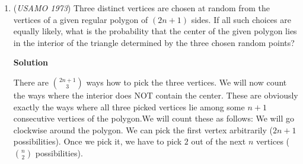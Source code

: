 \begin{enumerate}
 $X_n = \frac{1}{3}(2)^n + \frac{2}{3}(-1)^n$

 Doing the same for $Y_n$, we get

 $Y_n = 2(3)^n - (-1)^n$

 We know they're equal at $n = 0$, so let's set them equal and compare.

 $2(3)^n - (-1)^n = \frac{1}{3}((2)^n + 2(-1)^n)$
$6(3)^n - 3(-1)^n = (2)^n + 2(-1)^n$
$6(3)^n - 2^n = 5(-1)^n$

 By induction, we know in general that $(\alpha + 1)^n > \alpha^n$ for all $\alpha, n > 0$, so $6(3)^n > 2^n$ for all $n > 1$. 

 Therefore, the left hand side is always increasing and will never equal 5 again, so equality between $X_n$ and $Y_n$ only holds when $n = 0$, so they only share 1 term.

 


 



\textbf{Solution 3 (simple)}

First, $X_n$ and $Y_n$ are both positive for all nonnegative integers $n$. This is since $X_1$, $X_2$, $Y_1$, and $Y_2$ are all positive, and if $X_n$ and $X_{n-1}$ is positive then $X_{n+1}$ as a sum of two positive numbers is positive, and similarly for $Y_n$. Simple.

 Next, consider $Z_n = Y_n - X_n$. We have $Z_{n+1} = Y_n + Z_n + 3 Z_{n-1} + X_{n-1}$. Another easy inductive argument like above shows that $Z_n >0$ if $n>0$. But if $Z_n >0$ then $Z_n \ne 0$, so $X_n \ne Y_n$ as desired.

 
<i>Alternate solutions are always welcome. If you have a different, elegant solution to this problem, please \href{https://artofproblemsolving.com/wiki/index.php?title=1973\_USAMO\_Problems/Problem\_2&action=edit}{add it} to this page.</i>



	\item (\textit{USAMO 1973}) Three distinct vertices are chosen at random from the vertices of a given regular polygon of $(2n+1)$ sides. If all such choices are equally likely, what is the probability that the center of the given polygon lies in the interior of the triangle determined by the three chosen random points?


 



\textbf{Solution}

There are $\binom{2n+1}{3}$ ways how to pick the three vertices. We will now count the ways where the interior does NOT contain the center. These are obviously exactly the ways where all three picked vertices lie among some $n+1$ consecutive vertices of the polygon.We will count these as follows: We will go clockwise around the polygon. We can pick the first vertex arbitrarily ($2n+1$ possibilities). Once we pick it, we have to pick $2$ out of the next $n$ vertices ($\binom{n}{2}$ possibilities).


\end{enumerate}
